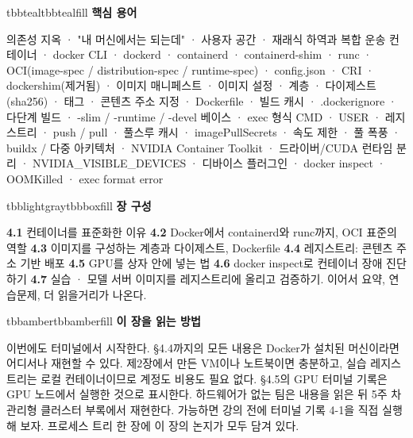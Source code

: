 \begin{calloutbox}{tbbteal}{tbbtealfill}
{\normalsize\bfseries\color{tbbteal}핵심 용어}\par\vspace{3pt}
의존성 지옥 · "내 머신에서는 되는데" · 사용자 공간 · 재래식 하역과 복합 운송 컨테이너 · docker CLI · dockerd · containerd · containerd-shim · runc · OCI(image-spec / distribution-spec / runtime-spec) · config.json · CRI · dockershim(제거됨) · 이미지 매니페스트 · 이미지 설정 · 계층 · 다이제스트(sha256) · 태그 · 콘텐츠 주소 지정 · Dockerfile · 빌드 캐시 · .dockerignore · 다단계 빌드 · -slim / -runtime / -devel 베이스 · exec 형식 CMD · USER · 레지스트리 · push / pull · 풀스루 캐시 · imagePullSecrets · 속도 제한 · 풀 폭풍 · buildx / 다중 아키텍처 · NVIDIA Container Toolkit · 드라이버/CUDA 런타임 분리 · NVIDIA\_VISIBLE\_DEVICES · 디바이스 플러그인 · docker inspect · OOMKilled · exec format error
\end{calloutbox}

\vspace{5.0pt}

\begin{calloutbox}{tbblightgray}{tbbboxfill}
{\normalsize\bfseries\color{tbbink}장 구성}\par\vspace{3pt}
\textbf{4.1} 컨테이너를 표준화한 이유    \textbf{4.2} Docker에서 containerd와 runc까지, OCI 표준의 역할    \textbf{4.3} 이미지를 구성하는 계층과 다이제스트, Dockerfile    \textbf{4.4} 레지스트리: 콘텐츠 주소 기반 배포    \textbf{4.5} GPU를 상자 안에 넣는 법    \textbf{4.6} docker inspect로 컨테이너 장애 진단하기    \textbf{4.7} 실습 · 모델 서버 이미지를 레지스트리에 올리고 검증하기. 이어서 요약, 연습문제, 더 읽을거리가 나온다.
\end{calloutbox}

\vspace{3.0pt}

\begin{calloutbox}{tbbamber}{tbbamberfill}
{\normalsize\bfseries\color{tbbamberdark}이 장을 읽는 방법}\par\vspace{3pt}
이번에도 터미널에서 시작한다. §4.4까지의 모든 내용은 Docker가 설치된 머신이라면 어디서나 재현할 수 있다. 제2장에서 만든 VM이나 노트북이면 충분하고, 실습 레지스트리는 로컬  컨테이너이므로 계정도 비용도 필요 없다. §4.5의 GPU 터미널 기록은 GPU 노드에서 실행한 것으로 표시한다. 하드웨어가 없는 팀은 내용을 읽은 뒤 5주 차 관리형 클러스터 부록에서 재현한다. 가능하면 강의 전에 터미널 기록 4-1을 직접 실행해 보자. 프로세스 트리 한 장에 이 장의 논지가 모두 담겨 있다.
\end{calloutbox}

